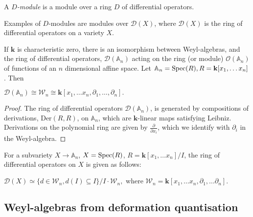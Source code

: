     

    \begin{defn}[\(D\)-module] A \emph{\(D\)-module} is a module over a ring \(D\) of differential operators.
    \end{defn}
    \begin{ex}
    Examples of \(D\)-modules are modules over \( \mathcal{D}(X)\), where \( \mathcal{D}(X)\) is the ring of differential operators on a variety \(X\).
    \end{ex}
    
    
    If \( \mathbf{k}\) is characteristic zero, there is an isomorphism between Weyl-algebras, and the ring of differential operators, \(\mathcal{D}( \mathbb{A}_n)\) acting on the ring (or module) \( \mathcal{O}(\mathbb{A}_n)\) of functions of an \(n\) dimensional affine space. Let \( \mathbb{A}_n = \mathrm{Spec}(R), R=\mathbf{k}[x_1, \dots x_n]\). Then
    \begin{lem}
    \(\mathcal{D}(\mathbb{A}_n) \cong \mathcal{W}_n \cong \mathbf{k}[x_1,\dots x_n,\partial_1, \dots , \partial_n].\)
    \end{lem}
    
    
    \begin{proof}
    The ring of differential operators \( \mathcal{D}(\mathbb{A}_n) \), is generated by compositions of derivations, \( \mathrm{Der}(R,R)\), on \(\mathbb{A}_n\), which are \(\mathbf{k}\)-linear maps satisfying Leibniz. Derivations on the polynomial ring are given by \( \frac{\partial}{\partial x_i}\), which we identify with \( \partial_i \) in the Weyl-algebra.
    \end{proof}
    
    For a subvariety \(X \rightarrow \mathbb{A}_n\), \(X = \mathrm{Spec}(R)\),  \(R=\mathbf{k}[x_1, \dots x_n]/I\), the ring of differential operators on \(X\) is given as follows:
    \begin{lem}
    \(  \mathcal{D}(X) \simeq \{ d \in \mathcal{W}_n, d(I) \subseteq I \}/I \cdot \mathcal{W}_n,\)  where
    \( \mathcal{W}_n=\mathbf{k}[x_1,\dots x_n, \partial_1, \dots \partial_n]\).
    \end{lem}
    
    \subsection{Weyl-algebras from deformation quantisation}
    
